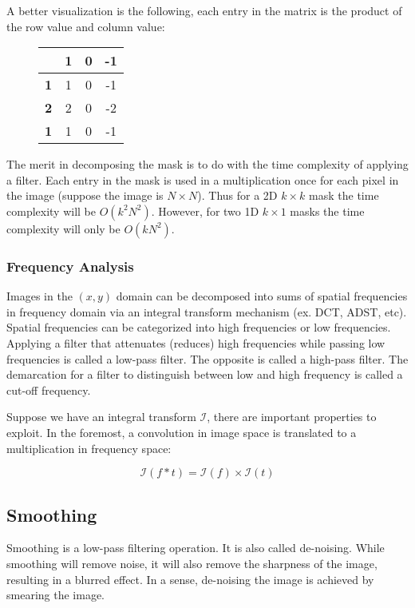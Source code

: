 \documentclass{article}
\begin{document}
\begin{multicols}{2}
A better visualization is the following, each entry in the matrix is the product of the row value and column value:
\begin{figure}[H]
  \centering
\begin{tabular}{c|ccc}
  & \textbf{1} & \textbf{0} & \textbf{-1}\\
  \hline
  \textbf{1} & 1 & 0 & -1\\
  \textbf{2} & 2 & 0 & -2\\
  \textbf{1} & 1 & 0 & -1
\end{tabular}
\end{figure}

The merit in decomposing the mask is to do with the time complexity of applying a filter. Each entry in the mask is used in a multiplication once for each pixel in the image (suppose the image is $N \times N$). Thus for a 2D $k \times k$ mask the time complexity will be $O(k^2N^2)$. However, for two 1D $k \times 1$ masks the time complexity will only be $O(kN^2)$.

\subsubsection{Frequency Analysis}

Images in the $(x,y)$ domain can be decomposed into sums of spatial frequencies in frequency domain via an integral transform mechanism (ex. DCT, ADST, etc). Spatial frequencies can be categorized into high frequencies or low frequencies. Applying a filter that attenuates (reduces) high frequencies while passing low frequencies is called a low-pass filter. The opposite is called a high-pass filter. The demarcation for a filter to distinguish between low and high frequency is called a cut-off frequency.

Suppose we have an integral transform $\mathcal{I}$, there are important properties to exploit. In the foremost, a convolution in image space is translated to a multiplication in frequency space:

$$
\mathcal{I}(f * t) = \mathcal{I}(f) \times \mathcal{I}(t)
$$

\subsection{Smoothing}

Smoothing is a low-pass filtering operation. It is also called de-noising. While smoothing will remove noise, it will also remove the sharpness of the image, resulting in a blurred effect. In a sense, de-noising the image is achieved by smearing the image.


\end{multicols}
\end{document}
